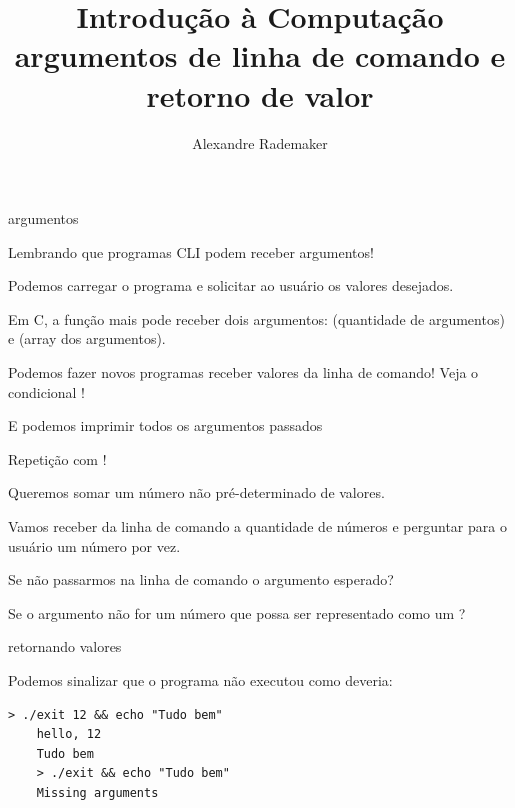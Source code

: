 \documentclass{beamer}
\title{Introdução à Computação \\ argumentos de linha de comando e retorno de valor}
\author{Alexandre Rademaker}
\date{}
\begin{document}
\begin{frame}
 \maketitle
\end{frame}

\begin{frame}{argumentos}
  
  Lembrando que programas CLI podem receber argumentos!

  Podemos carregar o programa e solicitar ao usuário os valores
  desejados.

  Em C, a função mais pode receber dois argumentos: 
  (quantidade de argumentos) e  (array dos argumentos).

  \framebreak

  Podemos fazer novos programas receber valores da linha de comando!
  Veja o condicional !

  

  \framebreak

  E podemos imprimir todos os argumentos passados

  

  Repetição com !

  \framebreak
  
  Queremos somar um número não pré-determinado de valores.

  Vamos receber da linha de comando a quantidade de números e
  perguntar para o usuário um número por vez.

  \framebreak

  

  \framebreak

  Se não passarmos na linha de comando o argumento esperado?

  Se o argumento não for um número que possa ser representado como um
  ?

\end{frame}

\begin{frame}{retornando valores}

  Podemos sinalizar que o programa não executou como deveria:

  

  \framebreak

  \begin{lstlisting}[style=normalbash]
    > ./exit 12 && echo "Tudo bem"
    hello, 12
    Tudo bem
    > ./exit && echo "Tudo bem"
    Missing arguments
  \end{lstlisting}
    
\end{frame}
\end{document}
